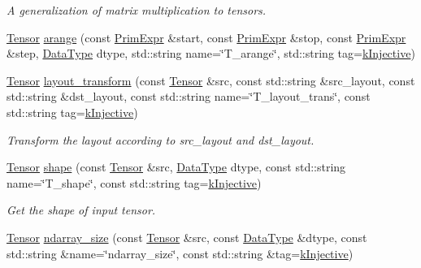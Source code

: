 \begin{DoxyCompactItemize}
\begin{DoxyCompactList}\small\item\em A generalization of matrix multiplication to tensors. \end{DoxyCompactList}\item 
\hyperlink{classtvm_1_1te_1_1Tensor}{Tensor} \hyperlink{namespacetopi_a894a6c11751558fa1ea5f1f3a9340ee9}{arange} (const \hyperlink{classtvm_1_1PrimExpr}{Prim\+Expr} \&start, const \hyperlink{classtvm_1_1PrimExpr}{Prim\+Expr} \&stop, const \hyperlink{classtvm_1_1PrimExpr}{Prim\+Expr} \&step, \hyperlink{namespacetvm_a41918af1a1dc386388639a9d3ad06c5d}{Data\+Type} dtype, std\+::string name=\char`\"{}T\+\_\+arange\char`\"{}, std\+::string tag=\hyperlink{namespacetopi_a60f05ec416e4618d25ad00dd9f536934}{k\+Injective})
\item 
\hyperlink{classtvm_1_1te_1_1Tensor}{Tensor} \hyperlink{namespacetopi_a2d6d01958fc4ae971259a37e4402703a}{layout\+\_\+transform} (const \hyperlink{classtvm_1_1te_1_1Tensor}{Tensor} \&src, const std\+::string \&src\+\_\+layout, const std\+::string \&dst\+\_\+layout, const std\+::string name=\char`\"{}T\+\_\+layout\+\_\+trans\char`\"{}, const std\+::string tag=\hyperlink{namespacetopi_a60f05ec416e4618d25ad00dd9f536934}{k\+Injective})
\begin{DoxyCompactList}\small\item\em Transform the layout according to {\ttfamily src\+\_\+layout} and {\ttfamily dst\+\_\+layout}. \end{DoxyCompactList}\item 
\hyperlink{classtvm_1_1te_1_1Tensor}{Tensor} \hyperlink{namespacetopi_a649c66231bc50f3ed98ac8bb6b6e2518}{shape} (const \hyperlink{classtvm_1_1te_1_1Tensor}{Tensor} \&src, \hyperlink{namespacetvm_a41918af1a1dc386388639a9d3ad06c5d}{Data\+Type} dtype, const std\+::string name=\char`\"{}T\+\_\+shape\char`\"{}, const std\+::string tag=\hyperlink{namespacetopi_a60f05ec416e4618d25ad00dd9f536934}{k\+Injective})
\begin{DoxyCompactList}\small\item\em Get the shape of input tensor. \end{DoxyCompactList}\item 
\hyperlink{classtvm_1_1te_1_1Tensor}{Tensor} \hyperlink{namespacetopi_a8d3203bcbca982300cfdfce1918e05ab}{ndarray\+\_\+size} (const \hyperlink{classtvm_1_1te_1_1Tensor}{Tensor} \&src, const \hyperlink{namespacetvm_a41918af1a1dc386388639a9d3ad06c5d}{Data\+Type} \&dtype, const std\+::string \&name=\char`\"{}ndarray\+\_\+size\char`\"{}, const std\+::string \&tag=\hyperlink{namespacetopi_a60f05ec416e4618d25ad00dd9f536934}{k\+Injective})

\end{DoxyCompactItemize}
